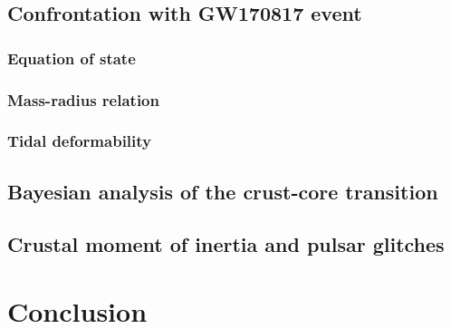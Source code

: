 
\subsection{Confrontation with GW170817 event} %

\subsubsection{Equation of state} %

\subsubsection{Mass-radius relation} %


\subsubsection{Tidal deformability} %


\subsection{Bayesian analysis of the crust-core transition} %


\subsection{Crustal moment of inertia and pulsar glitches} %


\section{Conclusion} %


